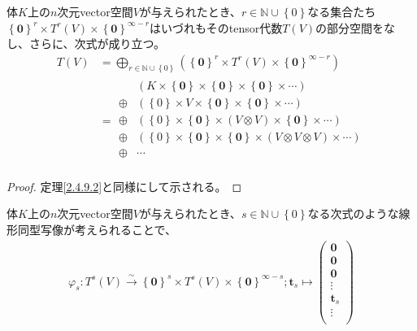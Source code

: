 \documentclass[dvipdfmx]{jsarticle}
\begin{document}
\begin{thm}\label{2.4.10.2}
体$K$上の$n$次元vector空間$V$が与えられたとき、$r \in \mathbb{N} \cup \left\{ 0 \right\}$なる集合たち$\left\{ \mathbf{0} \right\}^{r} \times T^{r}(V) \times \left\{ \mathbf{0} \right\}^{\infty - r}$はいづれもそのtensor代数$T(V)$の部分空間をなし、さらに、次式が成り立つ。
\begin{align*}
T(V) &= \bigoplus_{r \in \mathbb{N} \cup \left\{ 0 \right\}} \left( \left\{ \mathbf{0} \right\}^{r} \times T^{r}(V) \times \left\{ \mathbf{0} \right\}^{\infty - r} \right)\\
&= \begin{matrix}
\  & \left( K \times \left\{ \mathbf{0} \right\} \times \left\{ \mathbf{0} \right\} \times \left\{ \mathbf{0} \right\} \times \cdots \right) \\
 \oplus & \left( \left\{ 0 \right\} \times V \times \left\{ \mathbf{0} \right\} \times \left\{ \mathbf{0} \right\} \times \cdots \right) \\
 \oplus & \left( \left\{ 0 \right\} \times \left\{ \mathbf{0} \right\} \times (V \otimes V) \times \left\{ \mathbf{0} \right\} \times \cdots \right) \\
 \oplus & \left( \left\{ 0 \right\} \times \left\{ \mathbf{0} \right\} \times \left\{ \mathbf{0} \right\} \times (V \otimes V \otimes V) \times \cdots \right) \\
 \oplus & \cdots \\
\end{matrix}
\end{align*}
\end{thm}
\begin{proof} 定理\ref{2.4.9.2}と同様にして示される。
\end{proof}
\begin{thm}\label{2.4.10.3}
体$K$上の$n$次元vector空間$V$が与えられたとき、$s \in \mathbb{N} \cup \left\{ 0 \right\}$なる次式のような線形同型写像が考えられることで、
\begin{align*}
\varphi_{s}:T^{s}(V)\overset{\sim}{\rightarrow}\left\{ \mathbf{0} \right\}^{s} \times T^{s}(V) \times \left\{ \mathbf{0} \right\}^{\infty - s};\mathbf{t}_{s} \mapsto \begin{pmatrix}
\mathbf{0} \\
\mathbf{0} \\
\mathbf{0} \\
 \vdots \\
\mathbf{t}_{s} \\
 \vdots \\
\end{pmatrix}
\end{align*}
\end{thm}
\end{document}
